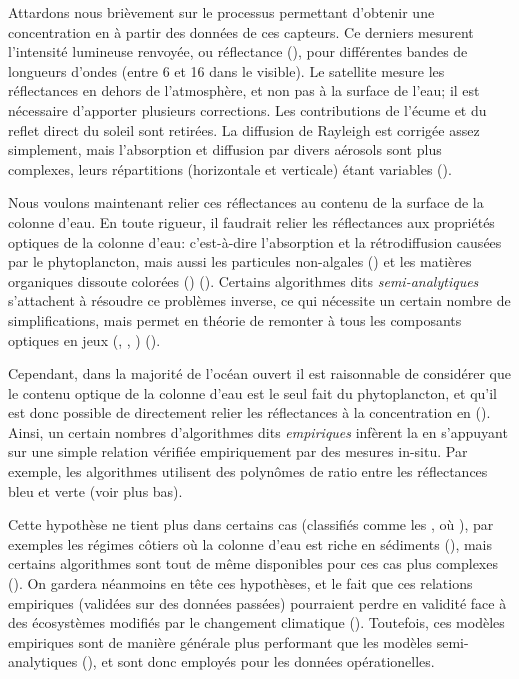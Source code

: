 Attardons nous brièvement sur le processus permettant d'obtenir une concentration en  à partir des données de ces capteurs.
Ce derniers mesurent l'intensité lumineuse renvoyée, ou réflectance (), pour différentes bandes de longueurs d'ondes (entre 6 et 16 dans le visible).
Le satellite mesure les réflectances en dehors de l'atmosphère, et non pas à la surface de l'eau; il est nécessaire d'apporter plusieurs corrections.
Les contributions de l'écume et du reflet direct du soleil sont retirées.
La diffusion de Rayleigh est corrigée assez simplement, mais l'absorption et diffusion par divers aérosols sont plus complexes, leurs répartitions (horizontale et verticale) étant variables (\cite{werdell_2018}).

Nous voulons maintenant relier ces réflectances au contenu de la surface de la colonne d'eau.
En toute rigueur, il faudrait relier les réflectances aux propriétés optiques de la colonne d'eau: c'est-à-dire l’absorption et la rétrodiffusion causées par le phytoplancton, mais aussi les particules non-algales () et les matières organiques dissoute colorées () (\cite{werdell_2018}).
Certains algorithmes dits \emph{semi-analytiques} s'attachent à résoudre ce problèmes inverse, ce qui nécessite un certain nombre de simplifications, mais permet en théorie de remonter à tous les composants optiques en jeux (, , ) (\cite{werdell_2019}).

Cependant, dans la majorité de l'océan ouvert il est raisonnable de considérer que le contenu optique de la colonne d'eau est le seul fait du phytoplancton\footnotemark, et qu'il est donc possible de directement relier les réflectances à la concentration en  (\cite{bailey_2006,brewin_2015a}).
Ainsi, un certain nombres d'algorithmes dits \emph{empiriques} infèrent la  en s'appuyant sur une simple relation vérifiée empiriquement par des mesures in-situ.
Par exemple, les algorithmes  utilisent des polynômes de ratio entre les réflectances bleu et verte (voir plus bas).

Cette hypothèse ne tient plus dans certains cas (classifiés comme les , où ), par exemples les régimes côtiers où la colonne d'eau est riche en sédiments (\cite{bailey_2006,brewin_2015a}), mais certains algorithmes sont tout de même disponibles pour ces cas plus complexes (\cite{gohin_2002}).
On gardera néanmoins en tête ces hypothèses, et le fait que ces relations empiriques (validées sur des données passées) pourraient perdre en validité face à des écosystèmes modifiés par le changement climatique (\cite{dierssen_2010}).
Toutefois, ces modèles empiriques sont de manière générale plus performant que les modèles semi-analytiques (\cite{brewin_2015a}), et sont donc employés pour les données opérationelles.

